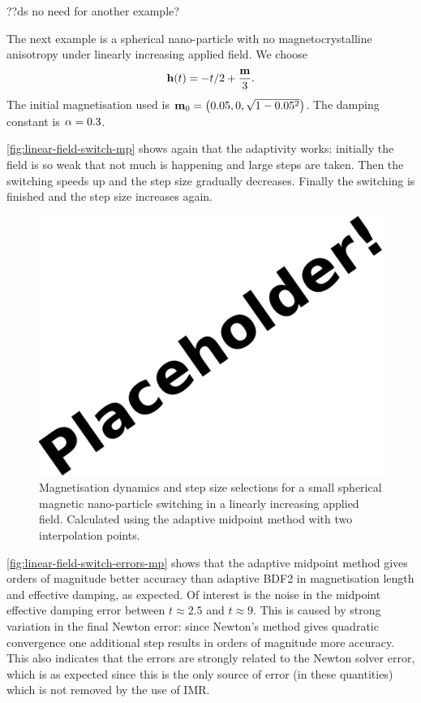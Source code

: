 ??ds no need for another example?

The next example is a spherical nano-particle with no magnetocrystalline anisotropy under linearly increasing applied field.
We choose
\begin{equation}
  \mathbf{h}(t) = - t/2 +  \frac{\mathbf{m}}{3}.
\end{equation}
The initial magnetisation used is $\mathbf{m}_0 = {\left(  0.05, 0, \sqrt{1 - 0.05^2}  \right)}$.
The damping constant is $\alpha = 0.3$.

\autoref{fig:linear-field-switch-mp} shows again that the adaptivity works: initially the field is so weak that not much is happening and large steps are taken.
Then the switching speeds up and the step size gradually decreases.
Finally the switching is finished and the step size increases again.

\begin{figure}[\figpos]
  \centering
  \includegraphics{images/placeholder}
  \caption{Magnetisation dynamics and step size selections for a small spherical magnetic nano-particle switching in a linearly increasing applied field. Calculated using the adaptive midpoint method with two interpolation points.}
  \label{fig:linear-field-switch-mp}
\end{figure}

\autoref{fig:linear-field-switch-errors-mp} shows that the adaptive midpoint method gives orders of magnitude better accuracy than adaptive BDF2 in magnetisation length and effective damping, as expected.
Of interest is the noise in the midpoint effective damping error between $t \approx 2.5$ and $t \approx 9$.
This is caused by strong variation in the final Newton error: since Newton's method gives quadratic convergence one additional step results in orders of magnitude more accuracy.
This also indicates that the errors are strongly related to the Newton solver error, which is as expected since this is the only source of error (in these quantities) which is not removed by the use of IMR.

